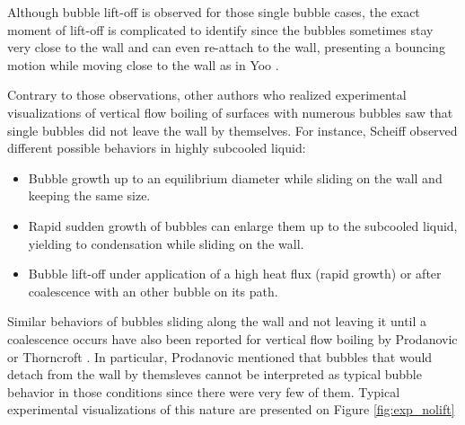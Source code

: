 \npar

Although bubble lift-off is observed for those single bubble cases, the exact moment of lift-off is complicated to identify since the bubbles sometimes stay very close to the wall and can even re-attach to the wall, presenting a bouncing motion while moving close to the wall as in Yoo \etal \cite{yoo_experimental_2016-1}.

\npar

Contrary to those observations, other authors who realized experimental visualizations of vertical flow boiling of surfaces with numerous bubbles saw that single bubbles did not leave the wall by themselves. For instance, Scheiff \cite{scheiff_etude_2018} observed different possible behaviors in highly subcooled liquid:

\begin{itemize}
\item Bubble growth up to an equilibrium diameter while sliding on the wall and keeping the same size. 
\item Rapid sudden growth of bubbles can enlarge them up to the subcooled liquid, yielding to condensation while sliding on the wall.
\item Bubble lift-off under application of a high heat flux (rapid growth) or after coalescence with an other bubble on its path.
\end{itemize}

Similar behaviors of bubbles sliding along the wall and not leaving it until a coalescence occurs have also been reported for vertical flow boiling by Prodanovic \etal \cite{prodanovic_bubble_2002} or Thorncroft \etal \cite{thorncroft_experimental_1998}. In particular, Prodanovic \etal mentioned that bubbles that would detach from the wall by themsleves cannot be interpreted as typical bubble behavior in those conditions since there were very few of them. Typical experimental visualizations of this nature are presented on Figure \ref{fig:exp_nolift}

